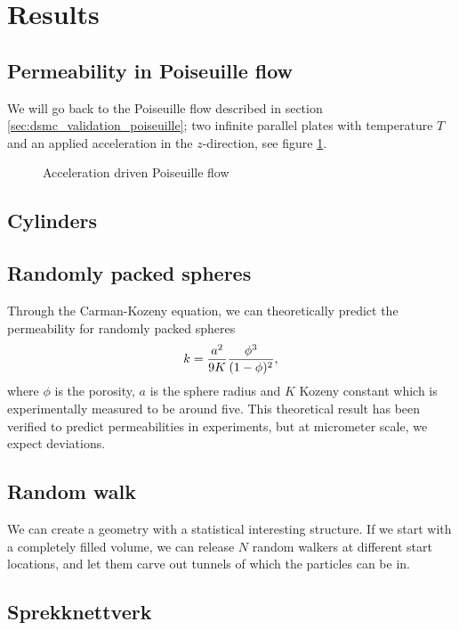 \section{Results}

\subsection{Permeability in Poiseuille flow}
We will go back to the Poiseuille flow described in section \ref{sec:dsmc_validation_poiseuille}; two infinite parallel plates with temperature $T$ and an applied acceleration in the $z$-direction, see figure \ref{fig:dsmc_poiseuille_system}. 

\begin{figure}[htp]
\centering
\label{fig:dsmc_poiseuille_system}
\caption{Acceleration driven Poiseuille flow}
\end{figure}

\subsection{Cylinders}

\subsection{Randomly packed spheres}
Through the Carman-Kozeny equation, we can theoretically predict the permeability for randomly packed spheres 
\begin{align}
	k = {a^2 \over 9K} {\phi^3 \over (1 - \phi)^2},
\end{align}
where $\phi$ is the porosity, $a$ is the sphere radius and $K$ Kozeny constant which is experimentally measured to be around five\cite{carman1937fluid}. This theoretical result has been verified to predict permeabilities in experiments, but at micrometer scale, we expect deviations. 

\subsection{Random walk}
We can create a geometry with a statistical interesting structure. If we start with a completely filled volume, we can release $N$ random walkers at different start locations, and let them carve out tunnels of which the particles can be in. 
\subsection{Sprekknettverk}
